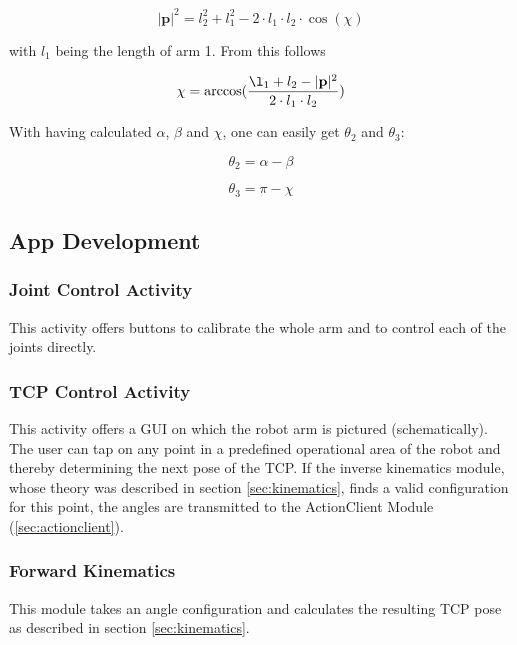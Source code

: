 \documentclass[conference]{IEEEtran}
\begin{document}
\begin{equation}
|\textbf{p}|^2 = l_2^2 + l_1^2 - 2 \cdot l_1 \cdot l_2 \cdot \cos(\chi)
\end{equation}

with $l_1$ being the length of arm 1. From this follows

\begin{equation}
\chi = \arccos(\frac{\l_1 + l_2 - |\textbf{p}|^2}{2 \cdot l_1 \cdot l_2})
\end{equation}

With having calculated $\alpha$, $\beta$ and $\chi$, one can easily get $\theta_2$ and $\theta_3$:

\begin{equation}
\theta_2 = \alpha - \beta
\end{equation}

\begin{equation}
\theta_3 = \pi - \chi
\end{equation}

\subsection{App Development}\label{sec:development}

\subsubsection{Joint Control Activity}
This activity offers buttons to calibrate the whole arm and to control each of the joints directly.

\subsubsection{TCP Control Activity}
This activity offers a GUI on which the robot arm is pictured (schematically). The user can tap on any point in a predefined operational area of the robot and thereby determining the next pose of the TCP. If the inverse kinematics module, whose theory was described in section \ref{sec:kinematics}, finds a valid configuration for this point, the angles are transmitted to the ActionClient Module (\ref{sec:actionclient}).

\subsubsection{Forward Kinematics}
This module takes an angle configuration and calculates the resulting TCP pose as described in section \ref{sec:kinematics}.
\end{document}
